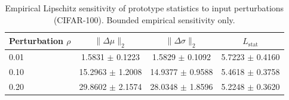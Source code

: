 \begin{table}[t]
\centering
\caption{Empirical Lipschitz sensitivity of prototype statistics to input perturbations (CIFAR-100). Bounded empirical sensitivity only.}
\label{tab:lstat}
\begin{tabular}{lccc}
\toprule
Perturbation $\rho$ & $\|\Delta\mu\|_2$ & $\|\Delta\sigma\|_2$ & $L_{\mathrm{stat}}$ \\
\midrule
0.01 & 1.5831 $\pm$ 0.1223 & 1.5829 $\pm$ 0.1092 & 5.7223 $\pm$ 0.4160 \\
0.10 & 15.2963 $\pm$ 1.2008 & 14.9377 $\pm$ 0.9588 & 5.4618 $\pm$ 0.3758 \\
0.20 & 29.8602 $\pm$ 2.1574 & 28.0348 $\pm$ 1.8596 & 5.2248 $\pm$ 0.3620 \\
\bottomrule
\end{tabular}
\end{table}

